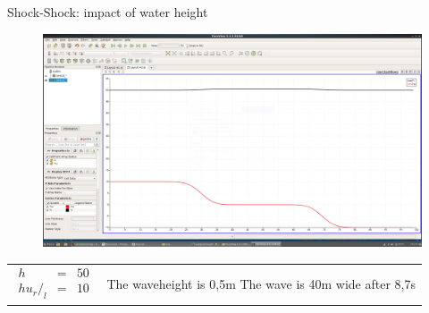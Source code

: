\documentclass[shortpres]{beamer}
\newcommand{\imgvoffset}{-20pt}
\newcommand{\imgfullscale}{0.75}
\begin{document}
\begin{frame}{Shock-Shock: impact of water height}
	\begin{figure}[t]
		\vspace{\imgvoffset}
		\includegraphics[width=\imgfullscale\linewidth]{img/Shock_h50_t8-7.png}
		\caption*{}
	\end{figure}
	
	\begin{tabular}{m{3cm} m{\linewidth-5cm}}
		$
		\begin{matrix}
		h & = & 50\\
		hu_r/_l & = & 10
		\end{matrix}
		$
		&
		
		The \Delta waveheight is 0,5m \newline
		The wave is 40m wide after 8,7s
	\end{tabular}
\end{frame}
\end{document}
